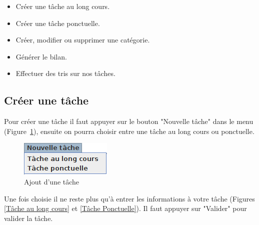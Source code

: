 \documentclass{article}
\begin{document}
\begin{itemize}
	\item Créer une tâche au long cours.
	\item Créer une tâche ponctuelle.
	\item Créer, modifier ou supprimer une catégorie.
	\item Générer le bilan.
	\item Effectuer des tris sur nos tâches.
\end{itemize}

\subsection{Créer une tâche}
Pour créer une tâche il faut appuyer sur le bouton "Nouvelle tâche" dans le menu (Figure~\ref{Taches barre}), ensuite on pourra choisir entre une tâche au long cours ou ponctuelle.

\begin{figure}
	\centering
	\includegraphics[scale=0.8]{images/MenuTache.png}
	\caption{Ajout d'une tâche}
	\label{Taches barre}
\end{figure}

Une fois choisie il ne reste plus qu'à entrer les informations à votre tâche (Figures \ref{Tâche au long cours} et \ref{Tâche Ponctuelle}). Il faut appuyer sur "Valider" pour valider la tâche.
\end{document}
